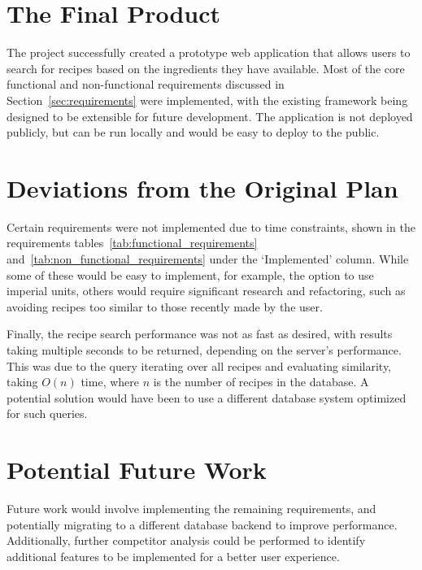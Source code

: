 {
\let\clearpage\relax

\section{The Final Product}

The project successfully created a prototype web application that allows users to search for recipes based on the ingredients they have available.
Most of the core functional and non-functional requirements discussed in Section~\ref{sec:requirements} were implemented, with the existing
framework being designed to be extensible for future development. The application is not deployed publicly, but can be run locally and would
be easy to deploy to the public.

\section{Deviations from the Original Plan}

Certain requirements were not implemented due to time constraints, shown in the requirements tables~\ref{tab:functional_requirements}
and~\ref{tab:non_functional_requirements} under the \enquote*{Implemented} column. While some of these would be easy to implement,
for example, the option to use imperial units, others would require significant research and refactoring, such as avoiding recipes too
similar to those recently made by the user.

Finally, the recipe search performance was not as fast as desired, with results taking multiple seconds to be returned, depending on the
server's performance. This was due to the query iterating over all recipes and evaluating similarity, taking $O(n)$ time, where $n$ is
the number of recipes in the database. A potential solution would have been to use a different database system optimized for such queries.

\section{Potential Future Work}

Future work would involve implementing the remaining requirements, and potentially migrating to a different database backend to improve
performance. Additionally, further competitor analysis could be performed to identify additional features to be implemented for a better
user experience.

} %
